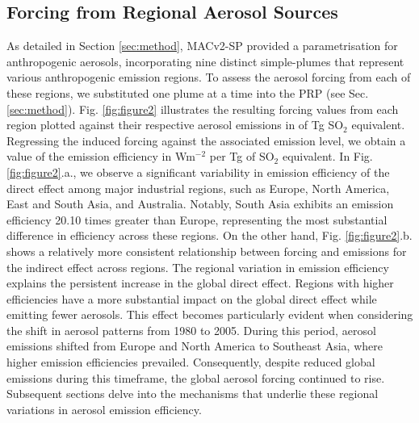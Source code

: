 \documentclass[draft]{agujournal2019}
\begin{document}
      \subsection{Forcing from Regional Aerosol Sources}
            As detailed in Section \ref{sec:method}, MACv2-SP provided a parametrisation for anthropogenic aerosols, incorporating nine distinct simple-plumes that represent various anthropogenic emission regions. To assess the aerosol forcing from each of these regions, we substituted one plume at a time into the PRP (see Sec. \ref{sec:method}). Fig. \ref{fig:figure2} illustrates the resulting forcing values from each region plotted against their respective aerosol emissions in of Tg SO$_2$ equivalent. Regressing the induced forcing against the associated emission level, we obtain a value of the emission efficiency in Wm$^{-2}$ per Tg of SO$_2$ equivalent.
            In Fig. \ref{fig:figure2}.a., we observe a significant variability in emission efficiency of the direct effect among major industrial regions, such as Europe, North America, East and South Asia, and Australia. Notably, South Asia exhibits an emission efficiency 20.10 times greater than Europe, representing the most substantial difference in efficiency across these regions. On the other hand, Fig. \ref{fig:figure2}.b. shows a relatively more consistent relationship between forcing and emissions for the indirect effect across regions. 
            The regional variation in emission efficiency explains the persistent increase in the global direct effect. Regions with higher efficiencies have a more substantial impact on the global direct effect while emitting fewer aerosols. This effect becomes particularly evident when considering the shift in aerosol patterns from 1980 to 2005. During this period, aerosol emissions shifted from Europe and North America to Southeast Asia, where higher emission efficiencies prevailed. Consequently, despite reduced global emissions during this timeframe, the global aerosol forcing continued to rise.
            Subsequent sections delve into the mechanisms that underlie these regional variations in aerosol emission efficiency.
\end{document}
